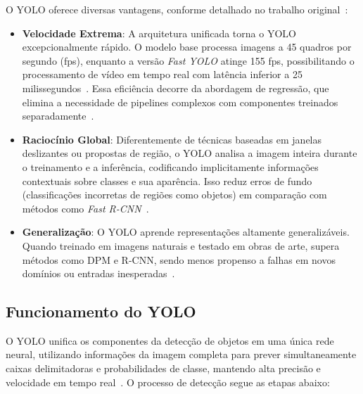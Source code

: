 \documentclass[journal,transmag]{IEEEtran}
\begin{document}
O YOLO oferece diversas vantagens, conforme detalhado no trabalho original~\cite{Redmon2015}:

\begin{itemize}
	\item \textbf{Velocidade Extrema}: A arquitetura unificada torna o YOLO excepcionalmente rápido. O modelo base processa imagens a 45 quadros por segundo (fps), enquanto a versão \textit{Fast YOLO} atinge 155 fps, possibilitando o processamento de vídeo em tempo real com latência inferior a 25 milissegundos~\cite{Redmon2015}. Essa eficiência decorre da abordagem de regressão, que elimina a necessidade de pipelines complexos com componentes treinados separadamente~\cite{Redmon2015}.
	\item \textbf{Raciocínio Global}: Diferentemente de técnicas baseadas em janelas deslizantes ou propostas de região, o YOLO analisa a imagem inteira durante o treinamento e a inferência, codificando implicitamente informações contextuais sobre classes e sua aparência. Isso reduz erros de fundo (classificações incorretas de regiões como objetos) em comparação com métodos como \textit{Fast R-CNN}~\cite{Redmon2015}.
	\item \textbf{Generalização}: O YOLO aprende representações altamente generalizáveis. Quando treinado em imagens naturais e testado em obras de arte, supera métodos como DPM e R-CNN, sendo menos propenso a falhas em novos domínios ou entradas inesperadas~\cite{Redmon2015}.
\end{itemize}

\subsection{Funcionamento do YOLO}

O YOLO unifica os componentes da detecção de objetos em uma única rede neural, utilizando informações da imagem completa para prever simultaneamente caixas delimitadoras e probabilidades de classe, mantendo alta precisão e velocidade em tempo real~\cite{Redmon2015}. O processo de detecção segue as etapas abaixo:
\end{document}
